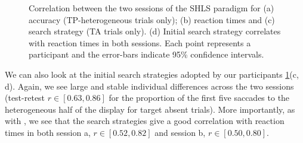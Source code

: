 \documentclass[twocolumn]{article}
\begin{document}
\begin{figure}
\centering
{}
\caption{Correlation between the two sessions of the SHLS paradigm for (a)  accuracy (TP-heterogeneous trials only); (b) reaction times and (c) search strategy (TA trials only). (d) Initial search strategy correlates with reaction times in both sessions. Each point represents a participant and the error-bars indicate 95\% confidence intervals.}
\label{fig:splithalf_summary}
\end{figure}

We can also look at the initial search strategies adopted by our participants \ref{fig:splithalf_summary}(c, d). Again, we see large and stable individual differences across the two sessions (test-retest $r \in [0.63, 0.86]$ for the proportion of the first five saccades to the heterogeneous half of the display for target absent trials). More importantly, as with \cite{nowakowska2017}, we see that the search strategies give a good correlation with reaction times in both session a, $r \in [0.52, 0.82]$ and session b, $r \in [0.50, 0.80]$.
\end{document}
